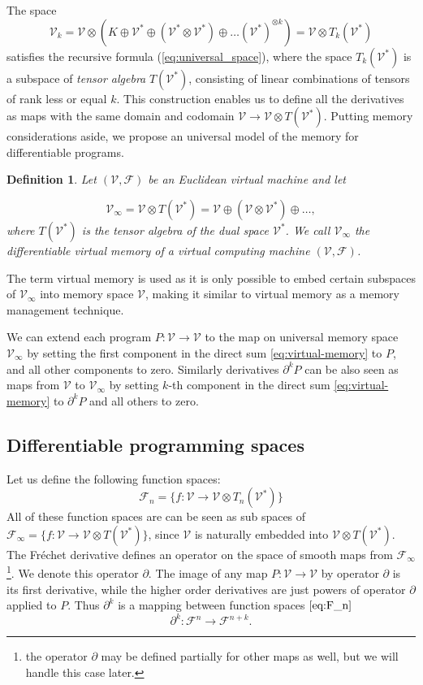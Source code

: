 \documentclass[smallcondensed]{svjour3}
\newcommand{\VV}{\mathcal{V}}
\newcommand{\F}{\mathcal{F}}
\newcommand{\D}{\partial}
\newtheorem{definicija}{Definition}[section]
\begin{document}
  The space
  \begin{equation}
    \label{eq:k-th-virtual-space}
    \VV_k = \VV\otimes \left(K\oplus \VV^* \oplus (\VV^*\otimes \VV^*)\oplus\ldots
      (\VV^*)^{\otimes k}\right) = \VV\otimes T_k(\VV^*)
  \end{equation}
  satisfies the recursive formula (\ref{eq:universal_space}), where the space
  $T_k(\VV^*)$ is a subspace of \emph{tensor algebra} $T(\VV^*)$, consisting of
  linear combinations of tensors of rank less or equal $k$. This construction
  enables us to define all the derivatives as maps with 
  the same domain and codomain $\VV\to \VV\otimes T(\VV^*)$.
  Putting memory considerations aside, we propose an universal model of the
  memory for differentiable programs.
\begin{definicija}
Let $(\VV,\F)$ be an Euclidean virtual machine and let  

\begin{equation}
\VV_\infty = \VV\otimes T(\VV^*) = \VV\oplus
(\VV\otimes\VV^*)\oplus\ldots,\label{eq:virtual-memory}
\end{equation}
where $T(\VV^*)$ is the tensor algebra of the dual space $\VV^*$.
We call $\VV_\infty$ the \emph{differentiable virtual memory} of a virtual
computing machine $(\VV,\F)$.
\end{definicija}
The term virtual memory is used as it is only possible to embed certain subspaces of $\VV_\infty$ into memory space $\VV$, making it similar to
virtual memory as a memory management technique.  

We can extend each program $P:\VV\to \VV$ to the map on
universal memory space $\VV_\infty$ by setting the first component in the direct sum
\eqref{eq:virtual-memory} to $P$, and all other components to zero. Similarly
derivatives $\D^k P$ can be also seen as maps  from $\VV$ to $\VV_\infty$ by
setting $k$-th component in the direct sum \eqref{eq:virtual-memory} to $\D^k P$
and all others to zero. 
\subsection{Differentiable programming spaces}

Let us define the following function spaces:
 \begin{equation}\label{eq:F_n}
 	\F_n=\{f:\VV\to \VV\otimes T_n(\VV^*)\}
 \end{equation}
All of these function spaces are can be seen as sub spaces of $\F_\infty=\{f:\VV\to \VV\otimes
T(\VV^*)\}$, since $\VV$ is naturally embedded into $ \VV\otimes T(\VV^*)$. The
Fréchet derivative defines an operator on the space of smooth maps from $\F_\infty$\footnote{the operator $\D$ may be defined partially for other maps as
   well, but we will handle this case later.}. We denote this operator $\D$. The image of any map
 $P:\VV\to \VV$ by operator $\D$ is its first derivative, while the higher order
 derivatives are just powers of operator $\D$ applied to $P$.
 Thus $\D^k$ is a mapping between function spaces $\eqref{eq:F_n}$
 \begin{equation}\label{eq:toFn+k}
 \D^k:\F^n\to\F^{n+k}.
 \end{equation}
 
\end{document}
